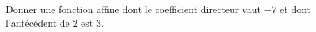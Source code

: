 
\begin{exercice}\label{exosmath-0499}

    Donner une fonction affine dont le coefficient directeur vaut \( -7\) et dont l'antécédent de \( 2\) est \( 3\).

\end{exercice}
